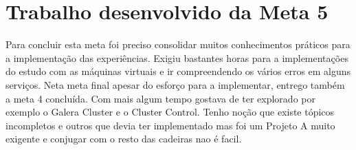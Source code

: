 \section{Trabalho desenvolvido da Meta 5}
Para concluir esta meta foi preciso consolidar muitos conhecimentos práticos para a implementação das experiências. Exigiu bastantes horas para a implementações do estudo com as máquinas virtuais e ir compreendendo os vários erros em alguns serviços. Neta meta final apesar do esforço para a implementar, entrego também a meta 4 concluída. Com mais algum tempo gostava de ter explorado por exemplo o Galera Cluster e o Cluster Control. Tenho noção que existe tópicos incompletos e outros que devia ter implementado mas foi um Projeto A muito exigente e conjugar com o resto das cadeiras nao é facil.